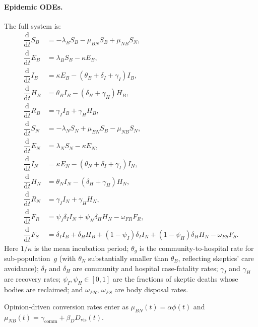 \documentclass[12pt,a4paper]{article}
\newcommand{\ddt}{\dfrac{\mathrm{d}}{\mathrm{d}t}}
\newcommand{\SB}{S_{\!B}}\newcommand{\EB}{E_{\!B}}
\newcommand{\IB}{I_{\!B}}\newcommand{\HB}{H_{\!B}}\newcommand{\RB}{R_{\!B}}
\newcommand{\SN}{S_{\!N}}\newcommand{\EN}{E_{\!N}}
\newcommand{\IN}{I_{\!N}}\newcommand{\HN}{H_{\!N}}\newcommand{\RN}{R_{\!N}}
\newcommand{\lB}{\lambda_B}\newcommand{\lN}{\lambda_N}
\begin{document}
\paragraph{Epidemic ODEs.}
The full system is:
\begin{align}
  \ddt \SB &= -\lB\SB - \mu_{BN}\SB + \mu_{NB}\SN, \label{eq:dSB}\\
  \ddt \EB &= \lB\SB - \kappa\EB, \label{eq:dEB}\\
  \ddt \IB &= \kappa\EB - (\theta_B + \delta_I + \gamma_I)\IB, \label{eq:dIB}\\
  \ddt \HB &= \theta_B\IB - (\delta_H + \gamma_H)\HB, \label{eq:dHB}\\
  \ddt \RB &= \gamma_I\IB + \gamma_H\HB, \label{eq:dRB}\\[4pt]
  \ddt \SN &= -\lN\SN + \mu_{BN}\SB - \mu_{NB}\SN, \label{eq:dSN}\\
  \ddt \EN &= \lN\SN - \kappa\EN, \label{eq:dEN}\\
  \ddt \IN &= \kappa\EN - (\theta_N + \delta_I + \gamma_I)\IN, \label{eq:dIN}\\
  \ddt \HN &= \theta_N\IN - (\delta_H + \gamma_H)\HN, \label{eq:dHN}\\
  \ddt \RN &= \gamma_I\IN + \gamma_H\HN, \label{eq:dRN}\\[4pt]
  \ddt F_R &= \psi_I\delta_I\IN + \psi_H\delta_H\HN - \omega_{FR}F_R,
             \label{eq:dFR}\\
  \ddt F_S &= \delta_I\IB + \delta_H\HB
              + (1-\psi_I)\delta_I\IN + (1-\psi_H)\delta_H\HN
              - \omega_{FS}F_S. \label{eq:dFS}
\end{align}
Here $1/\kappa$ is the mean incubation period; $\theta_g$ is the
community-to-hospital rate for sub-population~$g$ (with
$\theta_N$ substantially smaller than $\theta_B$, reflecting skeptics' care avoidance); $\delta_I$
and $\delta_H$ are community and hospital case-fatality rates; $\gamma_I$
and $\gamma_H$ are recovery rates; $\psi_I, \psi_H \in [0,1]$ are the
fractions of skeptic deaths whose bodies are reclaimed; and $\omega_{FR}$,
$\omega_{FS}$ are body disposal rates.

Opinion-driven conversion rates enter as $\mu_{BN}(t) = \alpha\phi(t)$
and $\mu_{NB}(t) = \gamma_{\text{comm}} + \beta_D D_{\text{vis}}(t)$.
\end{document}

